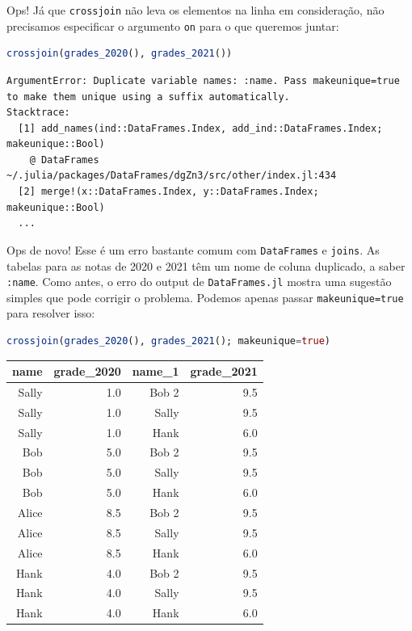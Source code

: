\documentclass[
  notoc %
]{tufte-book}
\newcommand{\passthrough}[1]{#1}
\begin{document}
Ops! Já que \passthrough{\lstinline!crossjoin!} não leva os elementos na
linha em consideração, não precisamos especificar o argumento
\passthrough{\lstinline!on!} para o que queremos juntar:

\begin{lstlisting}[language=Julia]
crossjoin(grades_2020(), grades_2021())
\end{lstlisting}

\begin{lstlisting}[language=Output]
ArgumentError: Duplicate variable names: :name. Pass makeunique=true to make them unique using a suffix automatically.
Stacktrace:
  [1] add_names(ind::DataFrames.Index, add_ind::DataFrames.Index; makeunique::Bool)
    @ DataFrames ~/.julia/packages/DataFrames/dgZn3/src/other/index.jl:434
  [2] merge!(x::DataFrames.Index, y::DataFrames.Index; makeunique::Bool)
  ...
\end{lstlisting}

Ops de novo! Esse é um erro bastante comum com
\passthrough{\lstinline!DataFrames!} e \passthrough{\lstinline!joins!}.
As tabelas para as notas de 2020 e 2021 têm um nome de coluna duplicado,
a saber \passthrough{\lstinline!:name!}. Como antes, o erro do output de
\passthrough{\lstinline!DataFrames.jl!} mostra uma sugestão simples que
pode corrigir o problema. Podemos apenas passar
\passthrough{\lstinline!makeunique=true!} para resolver isso:

\begin{lstlisting}[language=Julia]
crossjoin(grades_2020(), grades_2021(); makeunique=true)
\end{lstlisting}

\begin{longtable}[]{@{}rrrr@{}}
\toprule
name & grade\_2020 & name\_1 & grade\_2021 \\
\midrule
\endhead
Sally & 1.0 & Bob 2 & 9.5 \\
Sally & 1.0 & Sally & 9.5 \\
Sally & 1.0 & Hank & 6.0 \\
Bob & 5.0 & Bob 2 & 9.5 \\
Bob & 5.0 & Sally & 9.5 \\
Bob & 5.0 & Hank & 6.0 \\
Alice & 8.5 & Bob 2 & 9.5 \\
Alice & 8.5 & Sally & 9.5 \\
Alice & 8.5 & Hank & 6.0 \\
Hank & 4.0 & Bob 2 & 9.5 \\
Hank & 4.0 & Sally & 9.5 \\
Hank & 4.0 & Hank & 6.0 \\
\bottomrule
\end{longtable}
\end{document}
